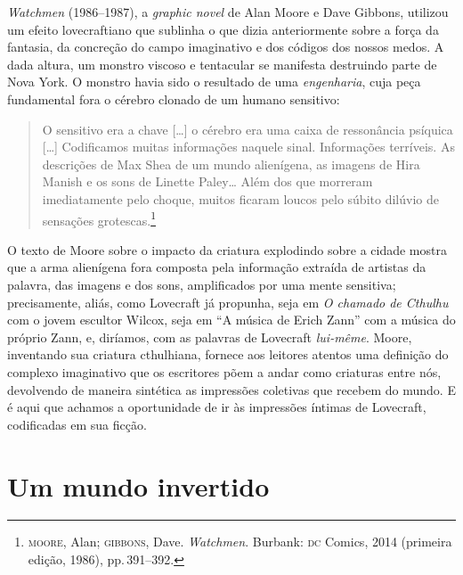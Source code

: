 \emph{Watchmen} (1986--1987), a \emph{graphic novel} de Alan Moore e Dave
Gibbons, utilizou um efeito lovecraftiano que sublinha o que dizia
anteriormente sobre a força da fantasia, da concreção do campo
imaginativo e dos códigos dos nossos medos. A dada altura, um monstro
viscoso e tentacular se manifesta destruindo parte de Nova York. O
monstro havia sido o resultado de uma \emph{engenharia}, cuja peça
fundamental fora o cérebro clonado de um humano sensitivo: 

\begin{quote}
O sensitivo
era a chave [\ldots{}] o cérebro era uma caixa de ressonância psíquica [\ldots{}]
Codificamos muitas informações naquele sinal. Informações terríveis. As
descrições de Max Shea de um mundo alienígena, as imagens de Hira Manish
e os sons de Linette Paley\ldots{} Além dos que morreram imediatamente pelo
choque, muitos ficaram loucos pelo súbito dilúvio de sensações
grotescas.\footnote{\textsc{moore}, Alan; \textsc{gibbons}, Dave. \emph{Watchmen}.
  Burbank: \textsc{dc} Comics, 2014 (primeira edição, 1986), pp.\,391--392.}
\end{quote}

O texto de Moore sobre o impacto da criatura explodindo sobre a cidade
mostra que a arma alienígena fora composta pela informação extraída de
artistas da palavra, das imagens e dos sons,
amplificados por uma mente sensitiva; precisamente, aliás, como
Lovecraft já propunha, seja em \emph{O chamado de Cthulhu} com o jovem
escultor Wilcox, seja em ``A música de Erich Zann'' com a música do
próprio Zann, e, diríamos, com as palavras de Lovecraft \emph{lui-même}.
Moore, inventando sua criatura cthulhiana, fornece aos leitores atentos
uma definição do complexo imaginativo que os escritores põem a andar
como criaturas entre nós, devolvendo de maneira sintética as impressões
coletivas que recebem do mundo. E é aqui que achamos a oportunidade de
ir às impressões íntimas de Lovecraft, codificadas em sua ficção.

\section{Um mundo invertido}

